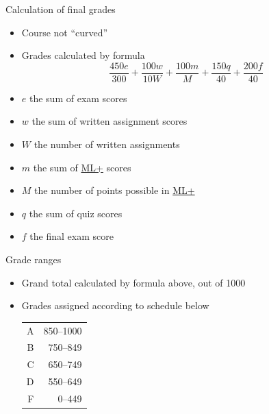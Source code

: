 \documentclass[xcolor=dvipsnames]{beamer}
\theoremstyle{definition}
\begin{document}
\begin{frame}{Calculation of final grades}
\begin{itemize}
\item Course not ``curved''
\item Grades calculated by formula
\[\frac{450e}{300}+\frac{100w}{10W}
+\frac{100m}{M}+\frac{150q}{40}+\frac{200f}{40}\]
\item $e$ the sum of exam scores
\item $w$ the sum of written assignment scores
\item $W$ the number of written assignments
\item $m$ the sum of
\href{http://iastate.mylabsplus.com}{\color{blue}ML+} scores
\item $M$ the number of points possible in
\href{http://iastate.mylabsplus.com}{\color{blue}ML+}
\item $q$ the sum of quiz scores
\item $f$ the final exam score
\end{itemize}
\end{frame}

\begin{frame}{Grade ranges}
\begin{itemize}
\item Grand total calculated by formula above, out of 1000
\item Grades assigned according to schedule below
\begin{center}\begin{tabular}{rr}
A&850--1000\\
B&750--849\\
C&650--749\\
D&550--649\\
F&0--449
\end{tabular}\end{center}
\end{itemize}
\end{frame}
\end{document}
